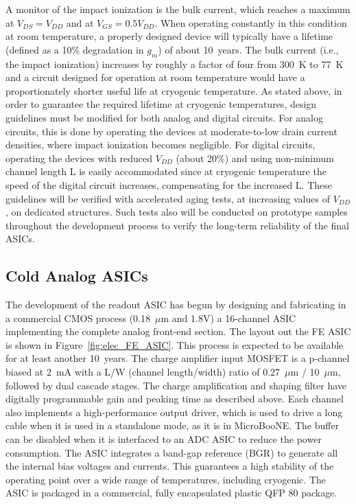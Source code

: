 A monitor of the impact ionization is the bulk current, which reaches a maximum at $V_{DS} = V_{DD}$ and at $V_{GS} = 0.5 V_{DD}$. 
When operating constantly in this condition at room temperature, a properly designed device 
will typically have a lifetime (defined as a 10\% degradation in $g_m$) of about 10~years. 
The bulk current (i.e., the impact ionization) increases by roughly a factor of four from 300~K to 77~K 
\cite{CMOS-reliability} and a circuit designed for operation at room temperature would have 
a proportionately shorter useful life at cryogenic temperature. As stated above, in order to guarantee 
the required lifetime at cryogenic temperatures, design guidelines must be modified for both analog 
and digital circuits. For analog circuits, this is done by operating the devices at moderate-to-low 
drain current densities, where impact ionization becomes negligible. 
%
For digital circuits, 
operating the devices with reduced $V_{DD}$ (about 20\%) and using non-minimum channel length L
is easily accommodated since at cryogenic temperature the speed of the digital circuit increases, 
compensating for the increased L. 
%
These guidelines will be verified with accelerated aging tests, 
at increasing values of $V_{DD}$, on dedicated structures. Such tests also will be conducted on 
prototype samples throughout the development process to verify the long-term reliability of the final ASICs.

%
\subsection{Cold Analog ASICs}
\label{subsec:fe_CMOS_analog}

The development of the readout ASIC has begun by designing and fabricating in a commercial CMOS
process (0.18~$\mu$m and 1.8V) a 16-channel ASIC implementing the complete analog front-end section.
The layout out the FE ASIC is shown in Figure~\ref{fig:elec_FE_ASIC}.
This process is expected to be available for at least another 10~years. 
The charge amplifier input MOSFET is a p-channel biased at 2~mA with a L/W (channel length/width) ratio
of 0.27~$\mu$m / 10~$\mu$m, followed by dual cascade stages.
The charge amplification and shaping filter have
digitally programmable gain and peaking time as described above. 
Each channel also implements a high-performance output driver,
which is used to drive a long cable when it is used in a standalone mode, as it is in MicroBooNE.\cite{microboone-url}
The buffer can be disabled when it is interfaced to an ADC ASIC to reduce the power consumption.
The ASIC integrates a band-gap reference (BGR) to generate all the internal bias voltages and currents.
This guarantees a high stability of the operating point over a wide range of
temperatures, including cryogenic.
The ASIC is packaged in a commercial, fully encapsulated plastic QFP 80 package.

